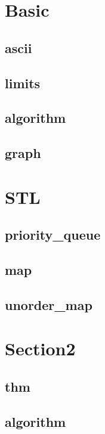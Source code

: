 \section{Basic}
    \subsection{ascii}
        
    \subsection{limits}
        
    \subsection{algorithm}
        
    \subsection{graph}
        

\section{STL}
    \subsection{priority\_queue}
        
    \subsection{map}
        
    \subsection{unorder\_map}
        

\section{Section2}
    \subsection{thm}
        
    \subsection{algorithm}
        